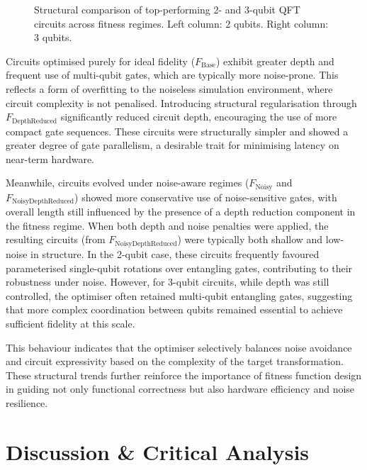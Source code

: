 \documentclass[11pt,a4paper]{article}
\begin{document}
\begin{figure}[H]
    \caption{Structural comparison of top-performing 2- and 3-qubit QFT circuits across fitness regimes. Left column: 2 qubits. Right column: 3 qubits.}
    \label{fig:structural_comparison_all}
\end{figure}

Circuits optimised purely for ideal fidelity ($F_{\mathrm{Base}}$) exhibit greater depth and frequent use of multi-qubit gates, which are typically more noise-prone. This reflects a form of overfitting to the noiseless simulation environment, where circuit complexity is not penalised. Introducing structural regularisation through $F_{\mathrm{DepthReduced}}$ significantly reduced circuit depth, encouraging the use of more compact gate sequences. These circuits were structurally simpler and showed a greater degree of gate parallelism, a desirable trait for minimising latency on near-term hardware.\newline

Meanwhile, circuits evolved under noise-aware regimes ($F_{\mathrm{Noisy}}$ and $F_{\mathrm{NoisyDepthReduced}}$) showed more conservative use of noise-sensitive gates, with overall length still influenced by the presence of a depth reduction component in the fitness regime. When both depth and noise penalties were applied, the resulting circuits (from $F_{\mathrm{NoisyDepthReduced}}$) were typically both shallow and low-noise in structure. In the 2-qubit case, these circuits frequently favoured parameterised single-qubit rotations over entangling gates, contributing to their robustness under noise. However, for 3-qubit circuits, while depth was still controlled, the optimiser often retained multi-qubit entangling gates, suggesting that more complex coordination between qubits remained essential to achieve sufficient fidelity at this scale.\newline

This behaviour indicates that the optimiser selectively balances noise avoidance and circuit expressivity based on the complexity of the target transformation. These structural trends further reinforce the importance of fitness function design in guiding not only functional correctness but also hardware efficiency and noise resilience.

%
%
\section{Discussion & Critical Analysis}\label{sec:analysis}
\end{document}
